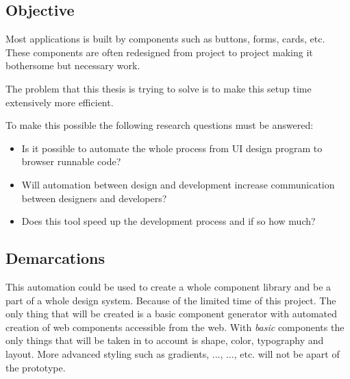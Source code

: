 \subsection{Objective}
Most applications is built by components such as buttons, forms, cards\cite{babichSimpleDesignTips2020}, etc. These components are often redesigned from project to project making it bothersome but necessary work.

The problem that this thesis is trying to solve is to make this setup time extensively more efficient. 

To make this possible the following research questions must be answered:
\begin{itemize}
  \item Is it possible to automate the whole process from UI design program to browser runnable code? 
  \item Will automation between design and development increase communication between designers and developers?
  \item Does this tool speed up the development process and if so how much?
\end{itemize}

\subsection{Demarcations}%
\label{sub:Demarcations}
This automation could be used to create a whole component library and be a part of a whole design system. Because of the limited time of this project. The only thing that will be created is a basic component generator with automated creation of web components accessible from the web. With \textit{basic} components the only things that will be taken in to account is shape, color, typography and layout. More advanced styling such as gradients, ..., ..., etc. will not be apart of the prototype.


